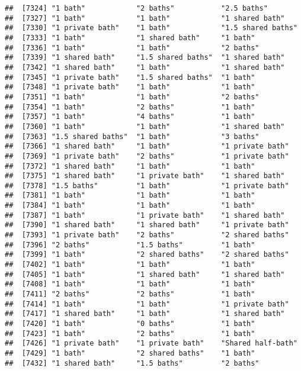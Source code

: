 \documentclass[
]{article}
\begin{document}
\begin{verbatim}
##  [7324] "1 bath"            "2 baths"           "2.5 baths"        
##  [7327] "1 bath"            "1 bath"            "1 shared bath"    
##  [7330] "1 private bath"    "1 bath"            "1.5 shared baths" 
##  [7333] "1 bath"            "1 shared bath"     "1 bath"           
##  [7336] "1 bath"            "1 bath"            "2 baths"          
##  [7339] "1 shared bath"     "1.5 shared baths"  "1 shared bath"    
##  [7342] "1 shared bath"     "1 bath"            "1 shared bath"    
##  [7345] "1 private bath"    "1.5 shared baths"  "1 bath"           
##  [7348] "1 private bath"    "1 bath"            "1 bath"           
##  [7351] "1 bath"            "1 bath"            "2 baths"          
##  [7354] "1 bath"            "2 baths"           "1 bath"           
##  [7357] "1 bath"            "4 baths"           "1 bath"           
##  [7360] "1 bath"            "1 bath"            "1 shared bath"    
##  [7363] "1.5 shared baths"  "1 bath"            "3 baths"          
##  [7366] "1 shared bath"     "1 bath"            "1 private bath"   
##  [7369] "1 private bath"    "2 baths"           "1 private bath"   
##  [7372] "1 shared bath"     "1 bath"            "1 bath"           
##  [7375] "1 shared bath"     "1 private bath"    "1 shared bath"    
##  [7378] "1.5 baths"         "1 bath"            "1 private bath"   
##  [7381] "1 bath"            "1 bath"            "1 bath"           
##  [7384] "1 bath"            "1 bath"            "1 bath"           
##  [7387] "1 bath"            "1 private bath"    "1 shared bath"    
##  [7390] "1 shared bath"     "1 shared bath"     "1 private bath"   
##  [7393] "1 private bath"    "2 baths"           "2 shared baths"   
##  [7396] "2 baths"           "1.5 baths"         "1 bath"           
##  [7399] "1 bath"            "2 shared baths"    "2 shared baths"   
##  [7402] "1 bath"            "1 bath"            "1 bath"           
##  [7405] "1 bath"            "1 shared bath"     "1 shared bath"    
##  [7408] "1 bath"            "1 bath"            "1 bath"           
##  [7411] "2 baths"           "2 baths"           "1 bath"           
##  [7414] "1 bath"            "1 bath"            "1 private bath"   
##  [7417] "1 shared bath"     "1 bath"            "1 shared bath"    
##  [7420] "1 bath"            "0 baths"           "1 bath"           
##  [7423] "1 bath"            "2 baths"           "1 bath"           
##  [7426] "1 private bath"    "1 private bath"    "Shared half-bath" 
##  [7429] "1 bath"            "2 shared baths"    "1 bath"           
##  [7432] "1 shared bath"     "1.5 baths"         "2 baths"          

\end{verbatim}
\end{document}

